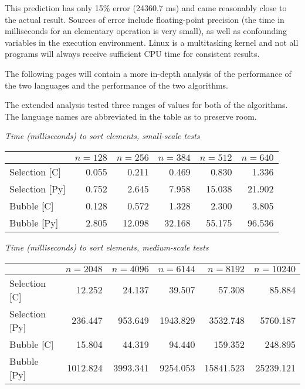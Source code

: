 \documentclass{article}
\begin{document}
This prediction has only 15\% error (24360.7 ms) and came reasonably close to the actual result. Sources of error include floating-point precision (the time in milliseconds for an elementary operation is very small), as well as confounding variables in the execution environment. Linux is a multitasking kernel and not all programs will always receive sufficient CPU time for consistent results.

The following pages will contain a more in-depth analysis of the performance of the two languages and the performance of the two algorithms.

\newpage

The extended analysis tested three ranges of values for both of the algorithms. The language names are abbreviated in the table as to preserve room.

\begin{center}
	\textit{Time (milliseconds) to sort elements, small-scale tests}
	\begin{tabular}{l | r | r | r | r | r}
		& $n=128$ & $n=256$ & $n=384$ & $n=512$ & $n=640$ \\ \hline
		Selection [C] & 0.055 & 0.211 & 0.469 & 0.830 & 1.336 \\ \hline
		Selection [Py] & 0.752 & 2.645 & 7.958 & 15.038 & 21.902 \\ \hline
		Bubble [C] & 0.128 & 0.572 & 1.328 & 2.300 & 3.805 \\ \hline
		Bubble [Py] & 2.805 & 12.098 & 32.168 & 55.175 & 96.536 \\
	\end{tabular}
\end{center}

\begin{center}
	\textit{Time (milliseconds) to sort elements, medium-scale tests}
	\begin{tabular}{l | r | r | r | r | r}
		& $n=2048$ & $n=4096$ & $n=6144$ & $n=8192$ & $n=10240$ \\ \hline
		Selection [C] & 12.252 & 24.137 & 39.507 & 57.308 & 85.884 \\ \hline
		Selection [Py] & 236.447 & 953.649 & 1943.829 & 3532.748 & 5760.187 \\ \hline
		Bubble [C] & 15.804 & 44.319 & 94.440 & 159.352 & 248.895 \\ \hline
		Bubble [Py] & 1012.824 & 3993.341 & 9254.053 & 15841.523 & 25239.121 \\
	\end{tabular}
\end{center}
\end{document}

